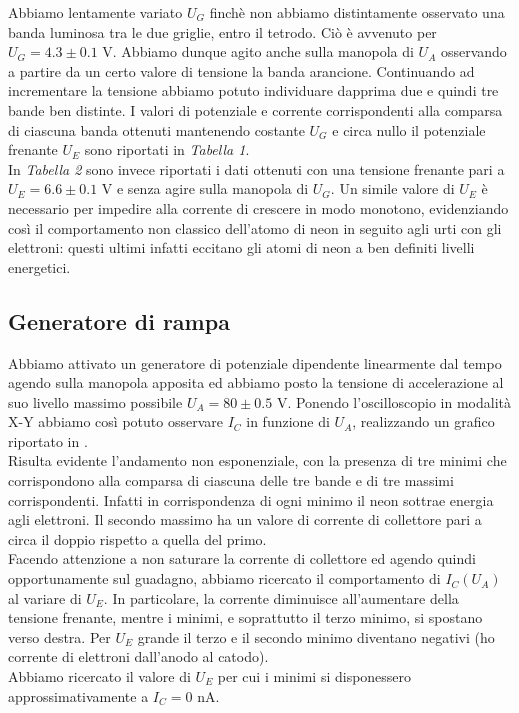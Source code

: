 Abbiamo lentamente variato $U_G$ finchè non abbiamo distintamente osservato una banda luminosa tra le due griglie, entro il tetrodo. Ciò è avvenuto per $U_G = 4.3 \pm 0.1$ V. Abbiamo dunque agito anche sulla manopola di $U_A$ osservando a partire da un certo valore di tensione la banda arancione. Continuando ad incrementare la tensione abbiamo potuto individuare dapprima due e quindi tre bande ben distinte.  I valori di potenziale e corrente corrispondenti alla comparsa di ciascuna banda ottenuti mantenendo costante $U_G$ e circa nullo il potenziale frenante $U_E$ sono riportati in \emph{Tabella 1}.\\
In \emph{Tabella 2} sono invece riportati i dati ottenuti con una tensione frenante pari a $U_E = 6.6 \pm 0.1$ V e senza agire sulla manopola di $U_G$. Un simile valore di $U_E$ è necessario per impedire alla corrente di crescere in modo monotono, evidenziando così il comportamento non classico dell'atomo di neon in seguito agli urti con gli elettroni: questi ultimi infatti eccitano gli atomi di neon a ben definiti livelli energetici.\\

\subsection{Generatore di rampa}

Abbiamo attivato un generatore di potenziale dipendente linearmente dal tempo agendo sulla manopola apposita ed abbiamo posto la tensione di accelerazione al suo livello massimo possibile $U_A = 80 \pm 0.5$ V. Ponendo l'oscilloscopio in modalità X-Y abbiamo così potuto osservare $I_C$ in funzione di $U_A$, realizzando un grafico riportato in . \\
Risulta evidente l'andamento non esponenziale, con la presenza di tre minimi che corrispondono alla comparsa di ciascuna delle tre bande e di tre massimi corrispondenti. Infatti in corrispondenza di ogni minimo il neon sottrae energia agli elettroni. Il secondo massimo ha un valore di corrente di collettore pari a circa il doppio rispetto a quella del primo.\\
Facendo attenzione a non saturare la corrente di collettore ed agendo quindi opportunamente sul guadagno, abbiamo ricercato il comportamento di $I_C(U_A)$ al variare di $U_E$. In particolare, la corrente diminuisce all'aumentare della tensione frenante, mentre i minimi, e soprattutto il terzo minimo, si spostano verso destra. Per $U_E$ grande il terzo e il secondo minimo diventano negativi (ho corrente di elettroni dall'anodo al catodo).\\
Abbiamo ricercato il valore di $U_E$ per cui i minimi si disponessero approssimativamente a $I_C = 0$ nA.
